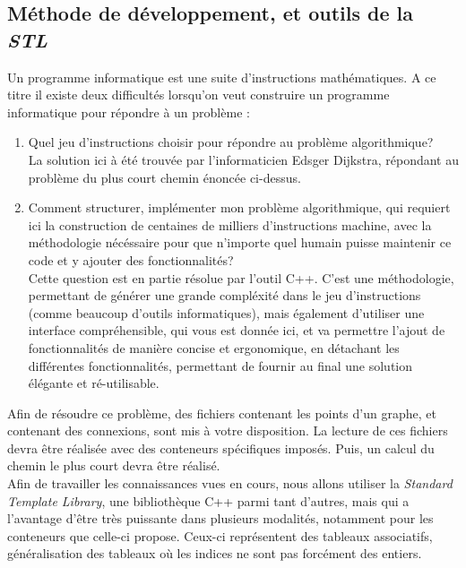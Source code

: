\documentclass[9pts]{article}
\begin{document}
\subsection{Méthode de développement, et outils de la \emph{STL}}

Un programme informatique est une suite d'instructions mathématiques. A ce titre il existe deux difficultés lorsqu'on veut construire un programme informatique pour répondre à un problème :
\begin{enumerate}
\item Quel jeu d'instructions choisir pour répondre au problème algorithmique?\\
La solution ici à été trouvée par l'informaticien Edsger Dijkstra, répondant au problème du plus court chemin énoncée ci-dessus.

\item Comment structurer, implémenter mon problème algorithmique, qui requiert ici la construction de centaines de milliers d'instructions machine, avec la méthodologie nécéssaire pour que n'importe quel humain puisse maintenir ce code et y ajouter des fonctionnalités?\\
Cette question est en partie résolue par l'outil C++. C'est une méthodologie, permettant de générer une grande compléxité dans le jeu d'instructions (comme beaucoup d'outils informatiques), mais également d'utiliser une interface compréhensible, qui vous est donnée ici, et va permettre l'ajout de fonctionnalités de manière concise et ergonomique, en détachant les différentes fonctionnalités, permettant de fournir au final une solution élégante et ré-utilisable.
\end{enumerate}


Afin de résoudre ce problème, des fichiers contenant les points d'un graphe, et contenant des connexions, sont mis à votre disposition. La lecture de ces fichiers devra être réalisée avec des conteneurs spécifiques imposés. Puis, un calcul du chemin le plus court devra être réalisé.\\

Afin de travailler les connaissances vues en cours, nous allons utiliser la \emph{Standard Template Library}, une bibliothèque C++ parmi tant d'autres, mais qui a l'avantage d'être très puissante dans plusieurs modalités, notamment pour les conteneurs que celle-ci propose. Ceux-ci représentent des tableaux associatifs, généralisation des tableaux où les indices ne sont pas forcément des entiers.\\
\end{document}
